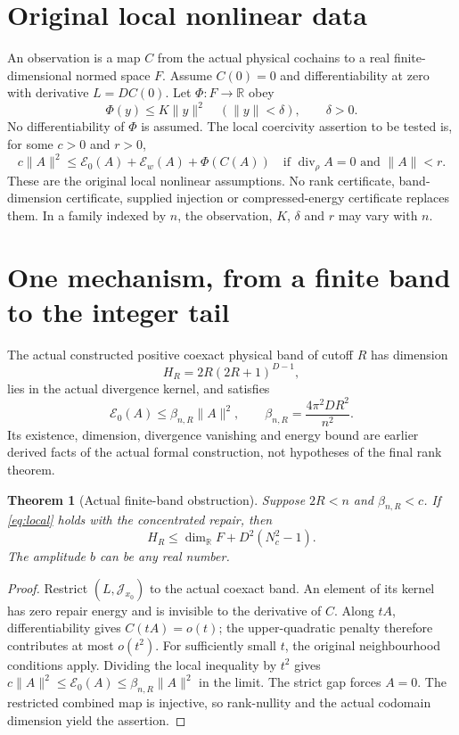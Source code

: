 \documentclass[11pt]{article}
\newtheorem{theorem}{Theorem}
\newcommand{\R}{\mathbb R}
\newcommand{\E}{\mathcal E}
\newcommand{\J}{\mathcal J}
\begin{document}
\section{Original local nonlinear data}
An observation is a map $C$ from the actual physical cochains to a real
finite-dimensional normed space $F$. Assume $C(0)=0$ and differentiability
at zero with derivative $L=DC(0)$. Let $\Phi:F\to\R$ obey
\[
 \Phi(y)\leq K\|y\|^2\quad(\|y\|<\delta),\qquad \delta>0.
\]
No differentiability of $\Phi$ is assumed. The local coercivity assertion to
be tested is, for some $c>0$ and $r>0$,
\begin{equation}\label{eq:local}
 c\|A\|^2\leq\E_0(A)+\E_w(A)+\Phi(C(A))
 \quad\text{if $\operatorname{div}_{\rho}A=0$ and $\|A\|<r$}.
\end{equation}
These are the original local nonlinear assumptions. No rank certificate,
band-dimension certificate, supplied injection or compressed-energy
certificate replaces them. In a family indexed by $n$, the observation,
$K$, $\delta$ and $r$ may vary with $n$.

\section{One mechanism, from a finite band to the integer tail}
The actual constructed positive coexact physical band of cutoff $R$ has
dimension
\[
 H_R=2R(2R+1)^{D-1},
\]
lies in the actual divergence kernel, and satisfies
\[
 \E_0(A)\leq\beta_{n,R}\|A\|^2,\qquad
 \beta_{n,R}=\frac{4\pi^2 D R^2}{n^2}.
\]
Its existence, dimension, divergence vanishing and energy bound are earlier
derived facts of the actual formal construction, not hypotheses of the
final rank theorem.

\begin{theorem}[Actual finite-band obstruction]\label{thm:band}
Suppose $2R<n$ and $\beta_{n,R}<c$. If \eqref{eq:local} holds with the
concentrated repair, then
\[
 H_R\leq\dim_{\R}F+D^2(N_c^2-1).
\]
The amplitude $b$ can be any real number.
\end{theorem}
\begin{proof}
Restrict $(L,\J_{x_0})$ to the actual coexact band. An element of its kernel
has zero repair energy and is invisible to the derivative of $C$. Along
$tA$, differentiability gives $C(tA)=o(t)$; the upper-quadratic penalty
therefore contributes at most $o(t^2)$. For sufficiently small $t$, the
original neighbourhood conditions apply. Dividing the local inequality by
$t^2$ gives $c\|A\|^2\leq\E_0(A)\leq\beta_{n,R}\|A\|^2$ in the limit.
The strict gap forces $A=0$. The restricted combined map is injective, so
rank-nullity and the actual codomain dimension yield the assertion.
\end{proof}
\end{document}
